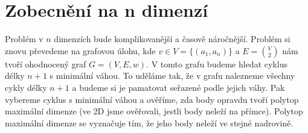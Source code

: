 \chapter{Zobecnění na n dimenzí}
\label{chap:n_dimenzi}

Problém v $n$ dimenzích bude komplikovanější a časově náročnější. Problém si znovu převedeme na grafovou úlohu, kde $v \in V = \{(a_1, a_n)\}$ a $E = \binom{V}{2}$ nám tvoří ohodnocený graf $G = (V, E, w)$. V tomto grafu budeme hledat cyklus délky $n+1$ s minimální váhou. To uděláme tak, že v grafu nalezneme všechny cykly délky $n+1$ a budeme si je pamatovat seřazené podle jejich váhy. Pak vybereme cyklus s minimální váhou a ověříme, zda body opravdu tvoří polytop maximální dimenze (ve 2D jsme ověřovali, jestli body neleží na přímce). Polytop maximální dimenze se vyznačuje tím, že jeho body neleží ve stejné nadrovině. 





